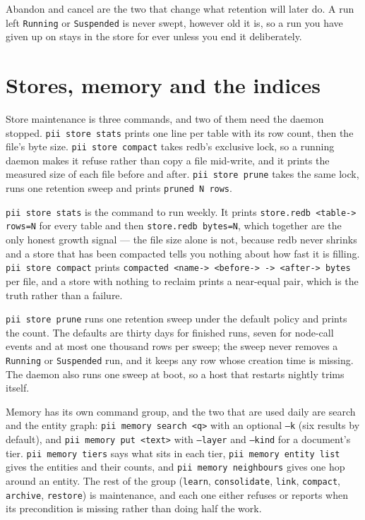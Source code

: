 Abandon and cancel are the two that change what retention will later do. A run left
\texttt{Running} or \texttt{Suspended} is never swept, however old it is, so a run you
have given up on stays in the store for ever unless you end it deliberately.

\section{Stores, memory and the indices}

Store maintenance is three commands, and two of them need the daemon stopped.
\texttt{pii store stats} prints one line per table with its row count, then the file's
byte size. \texttt{pii store compact} takes redb's exclusive lock, so a running daemon makes
it refuse rather than copy a file mid-write, and it prints the measured size of each file
before and after. \texttt{pii store prune} takes the same lock, runs one retention sweep and
prints \texttt{pruned N rows}.

\texttt{pii store stats} is the command to run weekly. It prints
\texttt{store.redb \textless{}table-> rows=N} for every table and then
\texttt{store.redb bytes=N}, which together are the only honest growth signal --- the file
size alone is not, because redb never shrinks and a store that has been compacted tells you
nothing about how fast it is filling. \texttt{pii store compact} prints
\texttt{compacted \textless{}name-> \textless{}before-> ->
\textless{}after-> bytes} per file, and a store with nothing to
reclaim prints a near-equal pair, which is the truth rather than a failure.

\texttt{pii store prune} runs one retention sweep under the default policy and prints the
count. The defaults are thirty days for finished runs, seven for node-call events and at
most one thousand rows per sweep; the sweep never removes a \texttt{Running} or
\texttt{Suspended} run, and it keeps any row whose creation time is missing. The daemon
also runs one sweep at boot, so a host that restarts nightly trims itself.

Memory has its own command group, and the two that are used daily are search and the
entity graph: \texttt{pii memory search \textless{}q\textgreater{}} with an optional
\texttt{--k} (six results by
default), and \texttt{pii memory put \textless{}text\textgreater{}} with \texttt{--layer} and
\texttt{--kind} for
a document's tier. \texttt{pii memory tiers} says what sits in each tier,
\texttt{pii memory entity list} gives the entities and their counts, and
\texttt{pii memory neighbours} gives one hop around an entity. The rest of the group
(\texttt{learn}, \texttt{consolidate}, \texttt{link}, \texttt{compact}, \texttt{archive},
\texttt{restore}) is maintenance, and each one either refuses or reports when its
precondition is missing rather than doing half the work.

